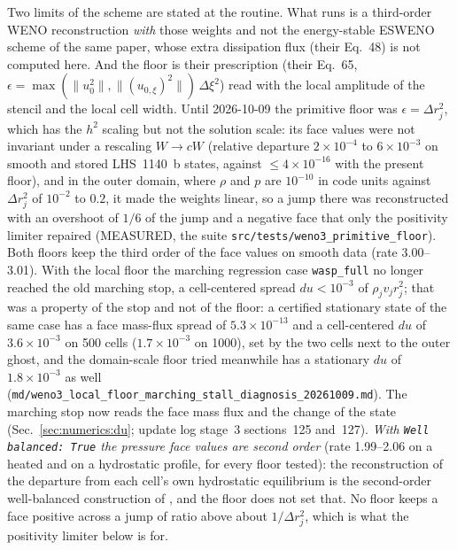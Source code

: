 Two limits of the scheme are stated at the routine.  What runs is a
third-order WENO reconstruction \emph{with} those weights and not the
energy-stable ESWENO scheme of the same paper, whose extra dissipation flux
(their Eq.~48) is not computed here.  And the floor is their prescription
(their Eq.~65, $\epsilon = \max(\|u_0^2\|, \|(u_{0,\xi})^2\|)\,\Delta\xi^2$)
read with the local amplitude of the stencil and the local cell width.  Until
2026-10-09 the primitive floor was $\epsilon = \Delta r_j^2$, which has the
$h^2$ scaling but not the solution scale: its face values were not invariant
under a rescaling $W\to cW$ (relative departure $2\times10^{-4}$ to
$6\times10^{-3}$ on smooth and stored LHS~1140~b states, against
$\le 4\times10^{-16}$ with the present floor), and in the outer domain, where
$\rho$ and $p$ are $10^{-10}$ in code units against $\Delta r_j^2$ of
$10^{-2}$ to $0.2$, it made the weights linear, so a jump there was
reconstructed with an overshoot of $1/6$ of the jump and a negative face that
only the positivity limiter repaired (MEASURED, the suite
\texttt{src/tests/weno3\_primitive\_floor}).  Both floors keep the third order
of the face values on smooth data (rate 3.00--3.01).  With the local floor the
marching regression case \texttt{wasp\_full} no longer reached the old
marching stop, a cell-centered spread $du<10^{-3}$ of $\rho_j v_j r_j^2$; that
was a property of the stop and not of the floor: a certified stationary state
of the same case has a face mass-flux spread of $5.3\times10^{-13}$ and a
cell-centered $du$ of $3.6\times10^{-3}$ on 500 cells ($1.7\times10^{-3}$ on
1000), set by the two cells next to the outer ghost, and the domain-scale
floor tried meanwhile has a stationary $du$ of $1.8\times10^{-3}$ as well
(\texttt{md/weno3\_local\_floor\_marching\_stall\_diagnosis\_20261009.md}).
The marching stop now reads the face mass flux and the change of the state
(Sec.~\ref{sec:numerics:du}; update log stage~3 sections~125 and~127).
\emph{With \texttt{Well balanced: True} the pressure face values are second
order} (rate 1.99--2.06 on a heated and on a hydrostatic profile, for every
floor tested): the reconstruction of the departure from each cell's own
hydrostatic equilibrium is the second-order well-balanced construction of
\citet{Kaeppeli2016}, and the floor does not set that.  No floor keeps a face
positive across a jump of ratio above about $1/\Delta r_j^2$, which is what
the positivity limiter below is for.


